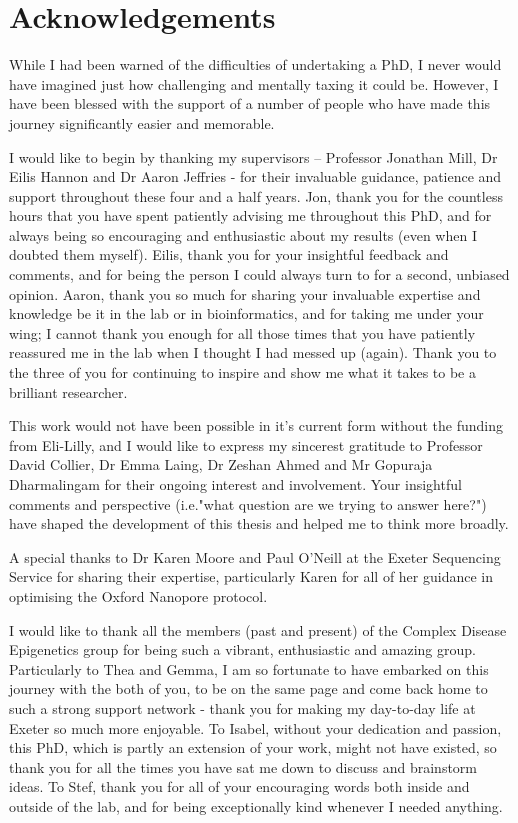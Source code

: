 \chapter*{Acknowledgements}

\begingroup
\singlespacing
While I had been warned of the difficulties of undertaking a PhD, I never would have imagined just how challenging and mentally taxing it could be. However, I have been blessed with the support of a number of people who have made this journey significantly easier and memorable. 

I would like to begin by thanking my supervisors – Professor Jonathan Mill, Dr Eilis Hannon and Dr Aaron Jeffries - for their invaluable guidance, patience and support throughout these four and a half years. Jon, thank you for the countless hours that you have spent patiently advising me throughout this PhD, and for always being so encouraging and enthusiastic about my results (even when I doubted them myself). Eilis, thank you for your insightful feedback and comments, and for being the person I could always turn to for a second, unbiased opinion. Aaron, thank you so much for sharing your invaluable expertise and knowledge be it in the lab or in bioinformatics, and for taking me under your wing; I cannot thank you enough for all those times that you have patiently reassured me in the lab when I thought I had messed up (again). Thank you to the three of you for continuing to inspire and show me what it takes to be a brilliant researcher. 

This work would not have been possible in it's current form without the funding from Eli-Lilly, and I would like to express my sincerest gratitude to Professor David Collier, Dr Emma Laing, Dr Zeshan Ahmed and Mr Gopuraja Dharmalingam for their ongoing interest and involvement. Your insightful comments and perspective (i.e."what question are we trying to answer here?") have shaped the development of this thesis and helped me to think more broadly. 

A special thanks to Dr Karen Moore and Paul O’Neill at the  Exeter Sequencing Service for sharing their expertise, particularly Karen for all of her guidance in optimising the Oxford Nanopore protocol.

I would like to thank all the members (past and present) of the Complex Disease Epigenetics group for being such a vibrant, enthusiastic and amazing group. Particularly to Thea and Gemma, I am so fortunate to have embarked on this journey with the both of you, to be on the same page and come back home to such a strong support network - thank you for making my day-to-day life at Exeter so much more enjoyable. To Isabel, without your dedication and passion, this PhD, which is partly an extension of your work, might not have existed, so thank you for all the times you have sat me down to discuss and brainstorm ideas. To Stef, thank you for all of your encouraging words both inside and outside of the lab, and for being exceptionally kind whenever I needed anything. 

